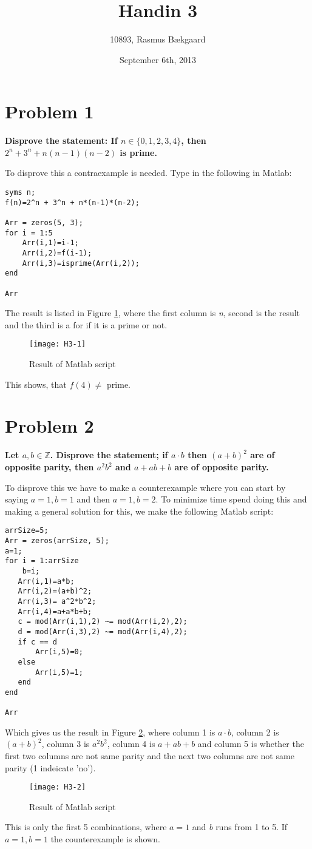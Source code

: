 \documentclass[english,10pt,a4paper]{article}
\title{Handin 3}
\author{10893, Rasmus Bækgaard}
\date{September 6th, 2013}
\begin{document}
\maketitle

\section*{Problem 1}
\textbf{Disprove the statement: If $n \in \{0, 1, 2, 3, 4\}$, then $2^n + 3^n + n(n-1)(n-2)$ is prime.}


To disprove this a contraexample is needed. 
Type in the following in Matlab:

\begin{lstlisting}[caption=Problem 1, style=Code-Matlab, label=lst:ref]
syms n;
f(n)=2^n + 3^n + n*(n-1)*(n-2);

Arr = zeros(5, 3);
for i = 1:5
    Arr(i,1)=i-1;
    Arr(i,2)=f(i-1);
    Arr(i,3)=isprime(Arr(i,2));
end

Arr
\end{lstlisting}
The result is listed in Figure \ref{fig:prob1}, where the first column is \textit{n}, second is the result and the third is a  for if it is a prime or not.
\begin{figure}[hbtp]
\centering
\texttt{[image: H3-1]}
\caption{Result of Matlab script}
\label{fig:prob1}
\end{figure}
This shows, that $f(4) \not=$ prime.


\section*{Problem 2}
\textbf{Let $a,b \in \mathbb{Z}$. Disprove the statement; if $a\cdot b$ then $(a+b)^2$ are of opposite parity, then $a^2b^2$ and $a+ab+b$ are of opposite parity.}


To disprove this we have to make a counterexample where you can start by saying $a=1, b=1$ and then $a=1, b=2$.
To minimize time spend doing this and making a general solution for this, we make the following Matlab script:

\begin{lstlisting}[caption=Problem 2, style=Code-Java, label=lst:prob2]
arrSize=5;
Arr = zeros(arrSize, 5);
a=1;
for i = 1:arrSize
    b=i;
   Arr(i,1)=a*b;
   Arr(i,2)=(a+b)^2;
   Arr(i,3)= a^2*b^2;
   Arr(i,4)=a+a*b+b;
   c = mod(Arr(i,1),2) ~= mod(Arr(i,2),2);
   d = mod(Arr(i,3),2) ~= mod(Arr(i,4),2);
   if c == d
       Arr(i,5)=0;
   else
       Arr(i,5)=1;
   end
end

Arr
\end{lstlisting}
Which gives us the result in Figure \ref{fig:prob2}, where column 1 is $a\cdot b$, column 2 is $(a+b)^2$, column 3 is $a^2b^2$, column 4 is $a+ab+b$ and column 5 is whether the first two columns are not same parity and the next two columns are not same parity (1 indeicate 'no').
\begin{figure}[hbtp]
\centering
\texttt{[image: H3-2]}
\caption{Result of Matlab script}
\label{fig:prob2}
\end{figure}
This is only the first 5 combinations, where $a=1$ and \textit{b} runs from 1 to 5.
If $a=1, b=1$ the counterexample is shown.
\end{document}
